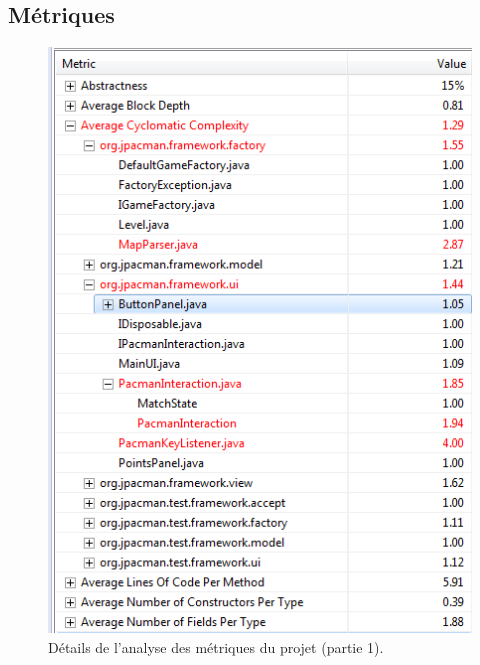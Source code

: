\documentclass[12pt,a4paper,final]{article}
\begin{document}
\subsection{Métriques}
\begin{figure}[!h]
	\centering
	\includegraphics[height=\textheight]{Metrique3.png}
	\caption{\label{métrique3}Détails de l'analyse des métriques du projet (partie 1).}
\end{figure}
\end{document}
